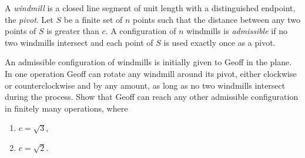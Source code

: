 A \emph{windmill} is a closed line segment of unit length with a distinguished endpoint, the \emph{pivot}. Let $S$ be a finite set of $n$ points such that the distance between any two points of $S$ is greater than $c$. A configuration of $n$ windmills is \emph{admissible} if no two windmills intersect and each point of $S$ is used exactly once as a pivot.

An admissible configuration of windmills is initially given to Geoff in the plane. In one operation Geoff can rotate any windmill around its pivot, either clockwise or counterclockwise and by any amount, as long as no two windmills intersect during the process. Show that Geoff can reach any other admissible configuration in finitely many operations, where
\begin{enumerate}[label=(\roman*)]
	\item $c = \sqrt 3$,
	\item $c = \sqrt 2$.
\end{enumerate}